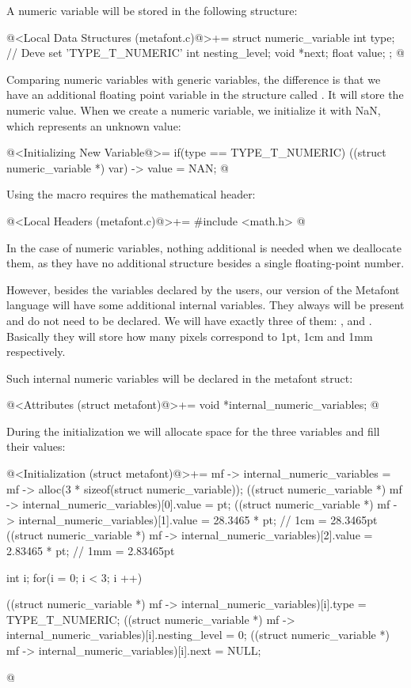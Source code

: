 
A numeric variable will be stored in the following structure:

\iniciocodigo
@<Local Data Structures (metafont.c)@>+=
struct numeric_variable{
  int type; // Deve set 'TYPE_T_NUMERIC'
  int nesting_level;
  void *next;
  float value;
};
@
\fimcodigo

Comparing numeric variables with generic variables, the difference is
that we have an additional floating point variable in the structure
called . It will store the numeric value. When we
create a numeric variable, we initialize it with NaN, which represents
an unknown value:

\iniciocodigo
@<Initializing New Variable@>=
if(type == TYPE_T_NUMERIC){
  ((struct numeric_variable *) var) -> value = NAN;
}
@
\fimcodigo

Using the macro  requires the mathematical header:

\iniciocodigo
@<Local Headers (metafont.c)@>+=
#include <math.h>
@
\fimcodigo

In the case of numeric variables, nothing additional is needed when we
deallocate them, as they have no additional structure besides a single
floating-point number.

However, besides the variables declared by the users, our version of
the Metafont language will have some additional internal
variables. They always will be present and do not need to be
declared. We will have exactly three of
them: ,  and . Basically
they will store how many pixels correspond to 1pt, 1cm and 1mm
respectively.

Such internal numeric variables will be declared in the metafont
struct:

\iniciocodigo
@<Attributes (struct metafont)@>+=
void *internal_numeric_variables;
@
\fimcodigo

During the initialization we will allocate space for the three
variables and fill their values:

\iniciocodigo
@<Initialization (struct metafont)@>+=
mf -> internal_numeric_variables =
             mf -> alloc(3 * sizeof(struct numeric_variable));
((struct numeric_variable *) mf -> internal_numeric_variables)[0].value =
   pt;
((struct numeric_variable *) mf -> internal_numeric_variables)[1].value =
   28.3465 * pt; // 1cm = 28.3465pt
((struct numeric_variable *) mf -> internal_numeric_variables)[2].value =
   2.83465 * pt; // 1mm = 2.83465pt
{
  int i;
  for(i = 0; i < 3; i ++){
    ((struct numeric_variable *)
      mf -> internal_numeric_variables)[i].type = TYPE_T_NUMERIC;
    ((struct numeric_variable *)
      mf -> internal_numeric_variables)[i].nesting_level = 0;
    ((struct numeric_variable *)
      mf -> internal_numeric_variables)[i].next = NULL;

  }
}
@
\fimcodigo

